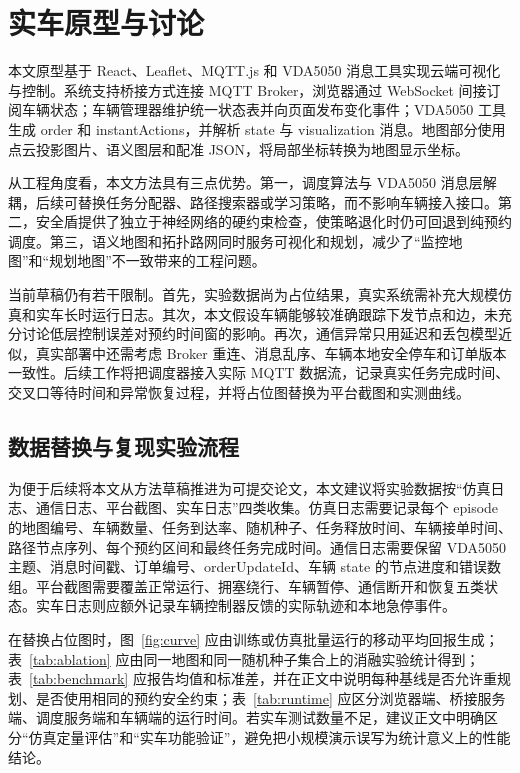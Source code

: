 \documentclass[UTF8,twocolumn,11pt]{ctexart}
\begin{document}
\section{实车原型与讨论}

本文原型基于 React、Leaflet、MQTT.js 和 VDA5050 消息工具实现云端可视化与控制。系统支持桥接方式连接 MQTT Broker，浏览器通过 WebSocket 间接订阅车辆状态；车辆管理器维护统一状态表并向页面发布变化事件；VDA5050 工具生成 order 和 instantActions，并解析 state 与 visualization 消息。地图部分使用点云投影图片、语义图层和配准 JSON，将局部坐标转换为地图显示坐标。

从工程角度看，本文方法具有三点优势。第一，调度算法与 VDA5050 消息层解耦，后续可替换任务分配器、路径搜索器或学习策略，而不影响车辆接入接口。第二，安全盾提供了独立于神经网络的硬约束检查，使策略退化时仍可回退到纯预约调度。第三，语义地图和拓扑路网同时服务可视化和规划，减少了“监控地图”和“规划地图”不一致带来的工程问题。

当前草稿仍有若干限制。首先，实验数据尚为占位结果，真实系统需补充大规模仿真和实车长时运行日志。其次，本文假设车辆能够较准确跟踪下发节点和边，未充分讨论低层控制误差对预约时间窗的影响。再次，通信异常只用延迟和丢包模型近似，真实部署中还需考虑 Broker 重连、消息乱序、车辆本地安全停车和订单版本一致性。后续工作将把调度器接入实际 MQTT 数据流，记录真实任务完成时间、交叉口等待时间和异常恢复过程，并将占位图替换为平台截图和实测曲线。

\subsection{数据替换与复现实验流程}

为便于后续将本文从方法草稿推进为可提交论文，本文建议将实验数据按“仿真日志、通信日志、平台截图、实车日志”四类收集。仿真日志需要记录每个 episode 的地图编号、车辆数量、任务到达率、随机种子、任务释放时间、车辆接单时间、路径节点序列、每个预约区间和最终任务完成时间。通信日志需要保留 VDA5050 主题、消息时间戳、订单编号、orderUpdateId、车辆 state 的节点进度和错误数组。平台截图需要覆盖正常运行、拥塞绕行、车辆暂停、通信断开和恢复五类状态。实车日志则应额外记录车辆控制器反馈的实际轨迹和本地急停事件。

在替换占位图时，图~\ref{fig:curve} 应由训练或仿真批量运行的移动平均回报生成；表~\ref{tab:ablation} 应由同一地图和同一随机种子集合上的消融实验统计得到；表~\ref{tab:benchmark} 应报告均值和标准差，并在正文中说明每种基线是否允许重规划、是否使用相同的预约安全约束；表~\ref{tab:runtime} 应区分浏览器端、桥接服务端、调度服务端和车辆端的运行时间。若实车测试数量不足，建议正文中明确区分“仿真定量评估”和“实车功能验证”，避免把小规模演示误写为统计意义上的性能结论。
\end{document}
